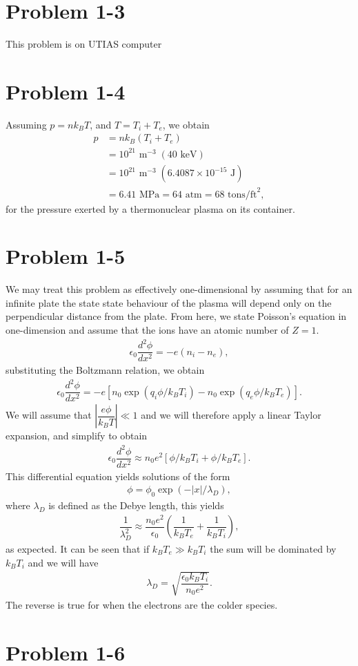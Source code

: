 \section*{Problem 1-3}
\label{sec:1-3}
This problem is on UTIAS computer

\section*{Problem 1-4}
\label{sec:1-4}
Assuming \(p = nk_BT\), and \(T = T_i + T_e\), we obtain
\begin{align}
	p &= nk_B(T_i + T_e) \\
	&= 10^{21}\text{ m}^{-3} \;(40\text{ keV}) \\
	&= 10^{21}\text{ m}^{-3} \;(6.4087\times10^{-15}\text{ J}) \\
	&= 6.41 \text{ MPa} = 64 \text{ atm} = 68 \text{ tons/ft}^2,
\end{align}
for the pressure exerted by a thermonuclear plasma on its container.

\section*{Problem 1-5}
\label{sec:1-5}
We may treat this problem as effectively one-dimensional by assuming that for an infinite plate the state state behaviour of the plasma will depend only on the perpendicular distance from the plate. From here, we state Poisson's equation in one-dimension and assume that the ions have an atomic number of \(Z = 1\).
\begin{align}
	\epsilon_0 \dfrac{d^2 \phi}{dx^2} = -e\left(n_i - n_e \right),
\end{align}
substituting the Boltzmann relation, we obtain
\begin{align}
	\epsilon_0 \dfrac{d^2 \phi}{dx^2} = -e\left[n_0\exp{(q_i\phi/k_BT_i)} - n_0\exp{(q_e\phi/k_BT_e)} \right].
\end{align}
We will assume that \(|\dfrac{e\phi}{k_BT}| \ll 1 \) and we will therefore apply a linear Taylor expansion, and simplify to obtain
\begin{align}
	\epsilon_0 \dfrac{d^2 \phi}{dx^2} \approx n_0e^2\left[\phi/k_BT_i + \phi/k_BT_e \right].
\end{align}
This differential equation yields solutions of the form
\begin{align}
	\phi = \phi_0 \exp{(-|x|/\lambda_D)},
\end{align}
where \(\lambda_D \) is defined as the Debye length, this yields
\begin{align}
	\dfrac{1}{\lambda_D^2} \approx \dfrac{n_0e^2}{\epsilon_0}\left(\dfrac{1}{k_BT_e} + \dfrac{1}{k_BT_i}  \right),
\end{align}
as expected. It can be seen that if \(k_BT_e \gg k_BT_i \) the sum will be dominated by \(k_BT_i \) and we will have
\begin{align}
	\lambda_D = \sqrt{\dfrac{\epsilon_0 k_BT_i}{n_0e^2}}.
\end{align}
The reverse is true for when the electrons are the colder species.

\section*{Problem 1-6}
\label{sec:1-6}






